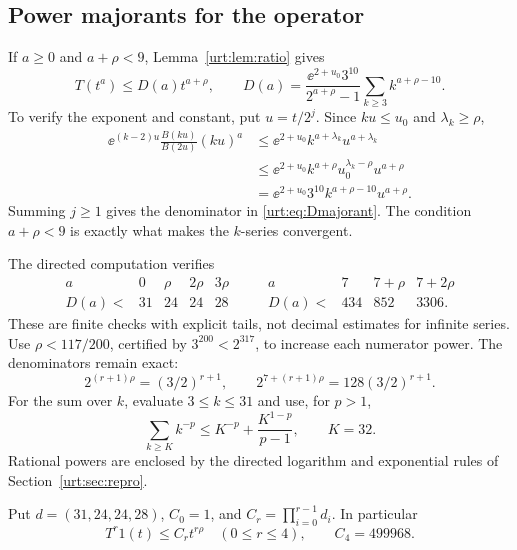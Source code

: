 \documentclass[11pt,letterpaper]{article}
\theoremstyle{remark}\newtheorem{remark}[theorem]{Remark}
\begin{document}
\subsection{Power majorants for the operator}
If $a\ge0$ and $a+\rho<9$, Lemma~\ref{urt:lem:ratio} gives
\begin{equation}\label{urt:eq:Dmajorant}
 T(t^a)\le D(a)t^{a+\rho},\qquad
 D(a)=\frac{\ee^{2+u_0}3^{10}}{2^{a+\rho}-1}
       \sum_{k\ge3}k^{a+\rho-10}.
\end{equation}
To verify the exponent and constant, put $u=t/2^j$. Since $ku\le u_0$ and $\lambda_k\ge\rho$,
\begin{align*}
 \ee^{(k-2)u}\frac{B(ku)}{B(2u)}(ku)^a
 &\le\ee^{2+u_0}k^{a+\lambda_k}u^{a+\lambda_k}\\
 &\le\ee^{2+u_0}k^{a+\rho}u_0^{\lambda_k-\rho}u^{a+\rho}\\
 &=\ee^{2+u_0}3^{10}k^{a+\rho-10}u^{a+\rho}.
\end{align*}
Summing $j\ge1$ gives the denominator in \eqref{urt:eq:Dmajorant}. The condition $a+\rho<9$ is exactly what makes the $k$-series convergent.

The directed computation verifies
\begin{equation}\label{urt:eq:Dconstants}
 \begin{array}{c|rrrr}
 a&0&\rho&2\rho&3\rho\\ \hline
 D(a)<&31&24&24&28
 \end{array}
 \qquad
 \begin{array}{c|rrr}
 a&7&7+\rho&7+2\rho\\ \hline
 D(a)<&434&852&3306.
 \end{array}
\end{equation}
These are finite checks with explicit tails, not decimal estimates for infinite series. Use $\rho<117/200$, certified by $3^{200}<2^{317}$, to increase each numerator power. The denominators remain exact:
\[
 2^{(r+1)\rho}=(3/2)^{r+1},\qquad
 2^{7+(r+1)\rho}=128(3/2)^{r+1}.
\]
For the sum over $k$, evaluate $3\le k\le31$ and use, for $p>1$,
\begin{equation}\label{urt:eq:pseries}
 \sum_{k\ge K}k^{-p}\le K^{-p}+\frac{K^{1-p}}{p-1},\qquad K=32.
\end{equation}
Rational powers are enclosed by the directed logarithm and exponential rules of Section~\ref{urt:sec:repro}.

Put $d=(31,24,24,28)$, $C_0=1$, and $C_r=\prod_{i=0}^{r-1}d_i$. In particular
\begin{equation}\label{urt:eq:T4}
 T^r1(t)\le C_rt^{r\rho}\quad(0\le r\le4),\qquad C_4=499968.
\end{equation}
\end{document}
